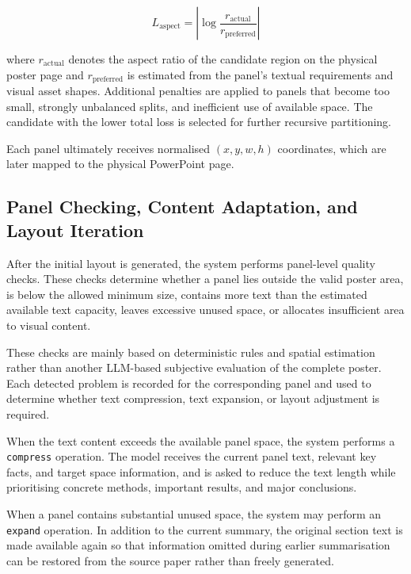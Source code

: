 \documentclass[12pt,oneside]{report}
\begin{document}
$$
L_{\mathrm{aspect}}
=
\left|
\log
\frac{r_{\mathrm{actual}}}
{r_{\mathrm{preferred}}}
\right|
$$

where \(r_{\mathrm{actual}}\) denotes the aspect ratio of the candidate region on the physical poster page and \(r_{\mathrm{preferred}}\) is estimated from the panel's textual requirements and visual asset shapes. Additional penalties are applied to panels that become too small, strongly unbalanced splits, and inefficient use of available space. The candidate with the lower total loss is selected for further recursive partitioning.

\vspace{1em}

Each panel ultimately receives normalised \((x,y,w,h)\) coordinates, which are later mapped to the physical PowerPoint page.

\subsection{Panel Checking, Content Adaptation, and Layout Iteration}

After the initial layout is generated, the system performs panel-level quality checks. These checks determine whether a panel lies outside the valid poster area, is below the allowed minimum size, contains more text than the estimated available text capacity, leaves excessive unused space, or allocates insufficient area to visual content.

\vspace{1em}

These checks are mainly based on deterministic rules and spatial estimation rather than another LLM-based subjective evaluation of the complete poster. Each detected problem is recorded for the corresponding panel and used to determine whether text compression, text expansion, or layout adjustment is required.

\vspace{1em}

When the text content exceeds the available panel space, the system performs a \texttt{compress} operation. The model receives the current panel text, relevant key facts, and target space information, and is asked to reduce the text length while prioritising concrete methods, important results, and major conclusions.

\vspace{1em}

When a panel contains substantial unused space, the system may perform an \texttt{expand} operation. In addition to the current summary, the original section text is made available again so that information omitted during earlier summarisation can be restored from the source paper rather than freely generated.
\end{document}

